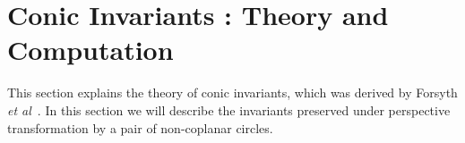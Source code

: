 \documentclass{bmvc2k}
\newcommand{\parmessage}[1]{\textcolor{cyan}{[Paragraph: #1]}}
\newcommand{\yuji}[1]{\textcolor{magenta}{[Yuji: #1]}}
\def\etal{\emph{et al}\bmvaOneDot}
\begin{document}


\section{Conic Invariants : Theory and Computation}
\label{Sec:ConicInv}
This section explains the theory of conic invariants, which was derived by Forsyth \etal~\cite{forsyth_91}. In this section we will describe the invariants preserved under perspective transformation by a pair of non-coplanar circles. 
\end{document}
